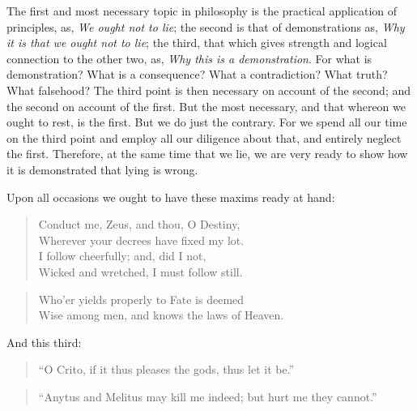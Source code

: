 The first and most necessary topic in philosophy is the practical
application of principles, as, \emph{We ought not to lie}; the second is that
of demonstrations as, \emph{Why it is that we ought not to lie}; the third,
that which gives strength and logical connection to the other two, as,
\emph{Why this is a demonstration}. For what is demonstration? What is a
consequence? What a contradiction? What truth? What falsehood? The third
point is then necessary on account of the second; and the second on
account of the first. But the most necessary, and that whereon we ought
to rest, is the first. But we do just the contrary. For we spend all our
time on the third point and employ all our diligence about that, and
entirely neglect the first. Therefore, at the same time that we lie, we
are very ready to show how it is demonstrated that lying is wrong.

Upon all occasions we ought to have these maxims ready at hand:

\begin{quote}
  Conduct me, Zeus, and thou, O Destiny, \\
  Wherever your decrees have fixed my lot. \\
  I follow cheerfully; and, did I not, \\
  Wicked and wretched, I must follow still.\footnotemark
\end{quote}

\begin{quote}
  Who'er yields properly to Fate is deemed \\
  Wise among men, and knows the laws of Heaven.\footnotemark
\end{quote}

And this third:

\begin{quote}
  ``O Crito, if it thus pleases the gods, thus let it be.''\footnotemark
\end{quote}

\begin{quote}
  ``Anytus and Melitus may kill me indeed; but hurt me they cannot.''\footnotemark
\end{quote}

